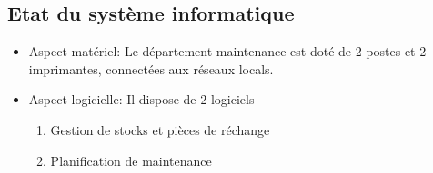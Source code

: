 \subsection{Etat du système informatique}
\begin{itemize}
    \item Aspect matériel: Le département maintenance est doté de 2 postes et 2 imprimantes, connectées aux réseaux locals.
    \item Aspect logicielle: Il dispose de 2 logiciels 
    \begin{enumerate}
        \item Gestion de stocks et pièces de réchange
        \item Planification de maintenance
    \end{enumerate}
\end{itemize}
